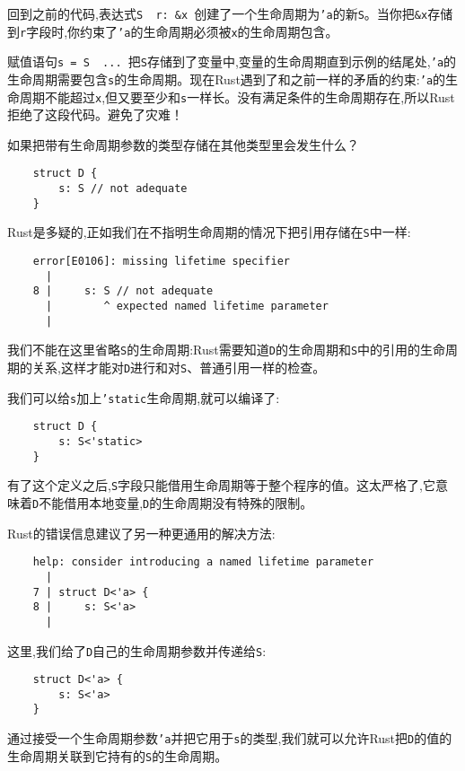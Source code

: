 回到之前的代码,表达式\texttt{S { r: \&x }}创建了一个生命周期为\texttt{'a}的新\texttt{S}。当你把\texttt{\&x}存储到\texttt{r}字段时,你约束了\texttt{'a}的生命周期必须被\texttt{x}的生命周期包含。

赋值语句\texttt{s = S { ... }}把\texttt{S}存储到了变量中,变量的生命周期直到示例的结尾处,\texttt{'a}的生命周期需要包含\texttt{s}的生命周期。现在Rust遇到了和之前一样的矛盾的约束:\texttt{'a}的生命周期不能超过\texttt{x},但又要至少和\texttt{s}一样长。没有满足条件的生命周期存在,所以Rust拒绝了这段代码。避免了灾难！

如果把带有生命周期参数的类型存储在其他类型里会发生什么？
\begin{verbatim}
    struct D {
        s: S // not adequate
    }
\end{verbatim}

Rust是多疑的,正如我们在不指明生命周期的情况下把引用存储在\texttt{S}中一样:
\begin{verbatim}
    error[E0106]: missing lifetime specifier
      |
    8 |     s: S // not adequate
      |        ^ expected named lifetime parameter
      |
\end{verbatim}

我们不能在这里省略\texttt{S}的生命周期:Rust需要知道\texttt{D}的生命周期和\texttt{S}中的引用的生命周期的关系,这样才能对\texttt{D}进行和对\texttt{S}、普通引用一样的检查。

我们可以给\texttt{s}加上\texttt{'static}生命周期,就可以编译了:
\begin{verbatim}
    struct D {
        s: S<'static>
    }
\end{verbatim}

有了这个定义之后,\texttt{S}字段只能借用生命周期等于整个程序的值。这太严格了,它意味着\texttt{D}不能借用本地变量,\texttt{D}的生命周期没有特殊的限制。

Rust的错误信息建议了另一种更通用的解决方法:
\begin{verbatim}
    help: consider introducing a named lifetime parameter
      |
    7 | struct D<'a> {
    8 |     s: S<'a>
      |
\end{verbatim}

这里,我们给了\texttt{D}自己的生命周期参数并传递给\texttt{S}:
\begin{verbatim}
    struct D<'a> {
        s: S<'a>
    }
\end{verbatim}

通过接受一个生命周期参数\texttt{'a}并把它用于\texttt{s}的类型,我们就可以允许Rust把\texttt{D}的值的生命周期关联到它持有的\texttt{S}的生命周期。

